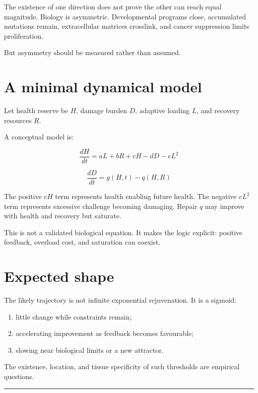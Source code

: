 The existence of one direction does not prove the other can reach equal magnitude. Biology is asymmetric. Developmental programs close, accumulated mutations remain, extracellular matrices crosslink, and cancer suppression limits proliferation.

But asymmetry should be measured rather than assumed.

\section{A minimal dynamical model}

Let health reserve be \(H\), damage burden \(D\), adaptive loading \(L\), and recovery resources \(R\).

A conceptual model is:

\[
\frac{dH}{dt} = aL + bR + cH - dD - eL^2
\]

\[
\frac{dD}{dt} = g(H,t) - q(H,R)
\]

The positive \(cH\) term represents health enabling future health. The negative \(eL^2\) term represents excessive challenge becoming damaging. Repair \(q\) may improve with health and recovery but saturate.

This is not a validated biological equation. It makes the logic explicit: positive feedback, overload cost, and saturation can coexist.

\section{Expected shape}

The likely trajectory is not infinite exponential rejuvenation. It is a sigmoid:

\begin{enumerate}
\def\labelenumi{\arabic{enumi}.}
\tightlist
\item
  little change while constraints remain;
\item
  accelerating improvement as feedback becomes favourable;
\item
  slowing near biological limits or a new attractor.
\end{enumerate}

The existence, location, and tissue specificity of such thresholds are empirical questions.

\begin{center}\rule{0.5\linewidth}{0.5pt}\end{center}
